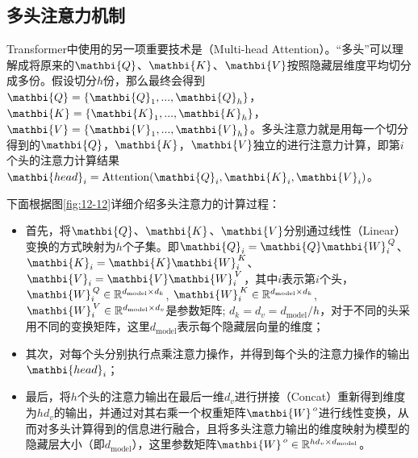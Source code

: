 
\subsection{多头注意力机制}

\parinterval Transformer中使用的另一项重要技术是{\small{}}（Multi-head Attention）。“多头”可以理解成将原来的$\mathbi{Q}$、$\mathbi{K}$、$\mathbi{V}$按照隐藏层维度平均切分成多份。假设切分$h$份，那么最终会得到$\mathbi{Q} = \{ \mathbi{Q}_1,...,\mathbi{Q}_h \}$，$\mathbi{K}=\{ \mathbi{K}_1,...,\mathbi{K}_h \}$，$\mathbi{V}=\{ \mathbi{V}_1,...,\mathbi{V}_h \}$。多头注意力就是用每一个切分得到的$\mathbi{Q}$，$\mathbi{K}$，$\mathbi{V}$独立的进行注意力计算，即第$i$个头的注意力计算结果$\mathbi{head}_i = \textrm{Attention}(\mathbi{Q}_i,\mathbi{K}_i, \mathbi{V}_i)$。

\parinterval 下面根据图\ref{fig:12-12}详细介绍多头注意力的计算过程：

\begin{itemize}
\vspace{0.5em}
\item 首先，将$\mathbi{Q}$、$\mathbi{K}$、$\mathbi{V}$分别通过线性（Linear）变换的方式映射为$h$个子集。即$\mathbi{Q}_i = \mathbi{Q}\mathbi{W}_i^{\,Q} $、$\mathbi{K}_i = \mathbi{K}\mathbi{W}_i^{\,K} $、$\mathbi{V}_i = \mathbi{V}\mathbi{W}_i^{\,V} $，其中$i$表示第$i$个头， $\mathbi{W}_i^{\,Q}  \in \mathbb{R}^{d_{\textrm{model}} \times d_k}$,  $\mathbi{W}_i^{\,K}  \in \mathbb{R}^{d_{\textrm{model}} \times d_k}$,  $\mathbi{W}_i^{\,V}  \in \mathbb{R}^{d_{\textrm{model}} \times d_v}$是参数矩阵; $d_k=d_v=d_{\textrm{model}} / h$，对于不同的头采用不同的变换矩阵，这里$d_{\textrm{model}}$表示每个隐藏层向量的维度；
\vspace{0.5em}
\item 其次，对每个头分别执行点乘注意力操作，并得到每个头的注意力操作的输出$\mathbi{head}_i$；
\vspace{0.5em}
\item 最后，将$h$个头的注意力输出在最后一维$d_v$进行拼接（Concat）重新得到维度为$hd_v$的输出，并通过对其右乘一个权重矩阵$\mathbi{W}^{\,o}$进行线性变换，从而对多头计算得到的信息进行融合，且将多头注意力输出的维度映射为模型的隐藏层大小（即$d_{\textrm{model}}$），这里参数矩阵$\mathbi{W}^{\,o} \in \mathbb{R}^{h d_v \times d_{\textrm{model}}}$。
\vspace{0.5em}
\end{itemize}

